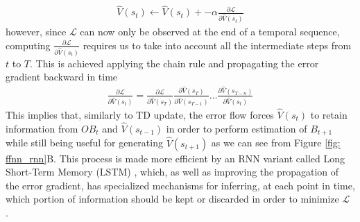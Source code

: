 \begin{gather}
\label{bptt_1}
    \widehat{V}(s_t) \leftarrow \widehat{V}(s_t) + -\alpha \frac{\partial \mathcal{L}}{\partial \widehat{V}(s_t)}
\end{gather}
however, since $\mathcal{L}$ can now only be observed at the end of a temporal sequence, computing $\frac{\partial \mathcal{L}}{\partial \widehat{V}(s_t)}$ requires us to take into account all the intermediate steps from $t$ to $T$. This is achieved applying the chain rule and propagating the error gradient backward in time \cite{bengio2017deep,lillicrap2019backpropagation}
\begin{gather}
\label{bptt_2}
    \frac{\partial \mathcal{L}}{\partial \widehat{V}(s_t)} = 
    \frac{\partial \mathcal{L}}{\partial \widehat{V}(s_{T})}
    \frac{\partial \widehat{V}(s_{T})}{\partial \widehat{V}(s_{T-1})}
    \dots
    \frac{\partial \widehat{V}(s_{T-n})}{\partial \widehat{V}(s_{t})}
\end{gather}
This implies that, similarly to TD update, the error flow forces $\widehat{V}(s_t)$ to retain information from $OB_t$ and $\widehat{V}(s_{t-1})$ in order to perform estimation of $B_{t+1}$ while still being useful for generating $\widehat{V}(s_{t+1})$ as we can see from Figure \ref{fig: ffnn_rnn}B. This process is made more efficient by an RNN variant called Long Short-Term Memory (LSTM) \cite{hochreiter1997long}, which, as well as improving the propagation of the error gradient, has specialized mechanisms for inferring, at each point in time, which portion of information should be kept or discarded in order to minimize $\mathcal{L}$ \cite{hochreiter1997long,bengio2017deep}.


